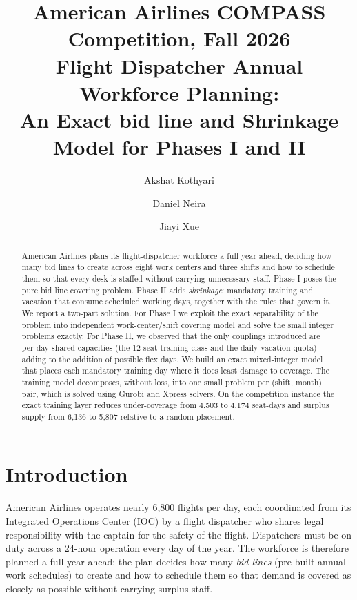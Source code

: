 \documentclass[preprint,12pt]{elsarticle}
\begin{document}
\begin{frontmatter}

\title{\textbf{American Airlines COMPASS Competition, Fall 2026}\\Flight Dispatcher Annual Workforce Planning:\\ An Exact bid line and Shrinkage Model for Phases I and II}

\author[1,2]{Akshat Kothyari}
\author[1,2]{Daniel Neira}
\author[1,3]{Jiayi Xue}

\begin{abstract}
   American Airlines plans its flight-dispatcher workforce a full year ahead, deciding how many bid lines to create across eight work centers and three shifts and how to schedule them so that every desk is staffed without carrying unnecessary staff. Phase I poses the pure bid line covering problem. Phase II adds \emph{shrinkage}: mandatory training and vacation that consume scheduled working days, together with the rules that govern it. We report a two-part solution. For Phase I we exploit the exact separability of the problem into independent work-center/shift covering model and solve the small integer problems exactly. For Phase II, we observed that the only couplings introduced are per-day shared capacities (the 12-seat training class and the daily vacation quota) adding to the addition of possible flex days. We build an exact mixed-integer model that places each mandatory training day where it does least damage to coverage. The training model decomposes, without loss, into one small problem per (shift, month) pair, which is solved using Gurobi and Xpress solvers. On the competition instance the exact training layer reduces under-coverage from 4,503 to 4,174 seat-days and surplus supply from 6,136 to 5,807 relative to a random placement.
\end{abstract}


\end{frontmatter}

\section{Introduction}
American Airlines operates nearly 6,800 flights per day, each coordinated from its Integrated Operations Center (IOC) by a flight dispatcher who shares legal responsibility with the captain for the safety of the flight. Dispatchers must be on duty across a 24-hour operation every day of the year. The workforce is therefore planned a full year ahead: the plan decides how many \emph{bid lines} (pre-built annual work schedules) to create and how to schedule them so that demand is covered as closely as possible without carrying surplus staff.
\end{document}
